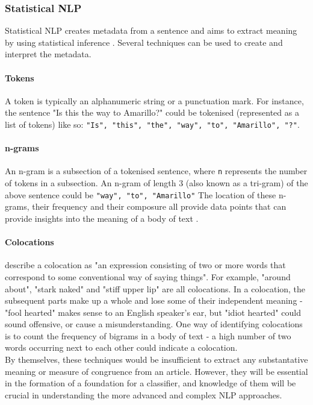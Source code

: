 \subsubsection{Statistical NLP}
Statistical NLP creates metadata from a sentence and aims to extract meaning by using statistical inference \cite{manning1999}. Several techniques can be used to create and interpret the metadata.

\paragraph{Tokens}
A token is typically an alphanumeric string or a punctuation mark. For instance, the sentence "Is this the way to Amarillo?" could be tokenised (represented as a list of tokens) like so: \texttt{"Is", "this", "the", "way", "to", "Amarillo", "?"}.\par
	
\paragraph{n-grams}
An n-gram is a subsection of a tokenised sentence, where \texttt{n} represents the number of tokens in a subsection. An n-gram of length 3 (also known as a tri-gram) of the above sentence could be \texttt{"way", "to", "Amarillo"}
	The location of these n-grams, their frequency and their composure all provide data points that can provide insights into the meaning of a body of text \cite{banerjee2003}.
	
\paragraph{Colocations}
\citeauthor{manning1999} describe a colocation as "an expression consisting of two or more words that correspond to some conventional way of saying things". For example, "around about", "stark naked" and "stiff upper lip" are all colocations. In a colocation, the subsequent parts make up a whole and lose some of their independent meaning - "fool hearted" makes sense to an English speaker's ear, but "idiot hearted" could sound offensive, or cause a misunderstanding.
	One way of identifying colocations is to count the frequency of bigrams in a body of text - a high number of two words occurring next to each other could indicate a colocation. \\

By themselves, these techniques would be insufficient to extract any substantative meaning or measure of congruence from an article. However, they will be essential in the formation of a foundation for a classifier, and knowledge of them will be crucial in understanding the more advanced and complex NLP approaches.


